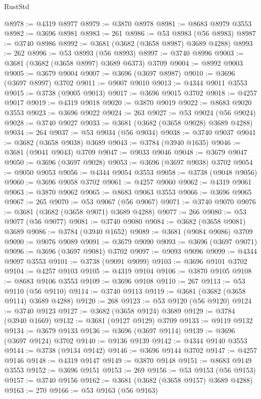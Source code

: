 \begin{lexlean}{RustStd}
\begin{coremodule}
@8978 := @4319 @8977
@8979 := @3870 @8978
@8981 := @8683 @8979 @3553
@8982 := @3696 @8981
@8983 := 261
@8986 := @53 @8983 (@56 @8983)
@8987 := @3740 @8986
@8992 := @3681 (@3682 (@3658 @8987) @3689 @4288)
@8993 := 262
@8996 := @53 @8993 (@56 @8993)
@8997 := @3740 @8996
@9003 := @3681 (@3682 (@3658 @8997) @3689 @6373) @3709
@9004 := @8992 @9003
@9005 := @3679 @9004
@9007 := @3696 (@3697 @8987)
@9010 := @3696 (@3697 @8997) @3702
@9011 := @9007 @9010
@9013 := @4344 @9011 @3553
@9015 := @3738 (@9005 @9013)
@9017 := @3696 @9015 @3702
@9018 := @4257 @9017
@9019 := @4319 @9018
@9020 := @3870 @9019
@9022 := @8683 @9020 @3553
@9023 := @3696 @9022
@9024 := 263
@9027 := @53 @9024 (@56 @9024)
@9028 := @3740 @9027
@9033 := @3681 (@3682 (@3658 @9028) @3689 @4288)
@9034 := 264
@9037 := @53 @9034 (@56 @9034)
@9038 := @3740 @9037
@9041 := @3682 (@3658 @9038) @3689
@9043 := @3784 (@3940 @1635)
@9046 := @3681 (@9041 @9043) @3709
@9047 := @9033 @9046
@9048 := @3679 @9047
@9050 := @3696 (@3697 @9028)
@9053 := @3696 (@3697 @9038) @3702
@9054 := @9050 @9053
@9056 := @4344 @9054 @3553
@9058 := @3738 (@9048 @9056)
@9060 := @3696 @9058 @3702
@9061 := @4257 @9060
@9062 := @4319 @9061
@9063 := @3870 @9062
@9065 := @8683 @9063 @3553
@9066 := @3696 @9065
@9067 := 265
@9070 := @53 @9067 (@56 @9067)
@9071 := @3740 @9070
@9076 := @3681 (@3682 (@3658 @9071) @3689 @4288)
@9077 := 266
@9080 := @53 @9077 (@56 @9077)
@9081 := @3740 @9080
@9084 := @3682 (@3658 @9081) @3689
@9086 := @3784 (@3940 @1652)
@9089 := @3681 (@9084 @9086) @3709
@9090 := @9076 @9089
@9091 := @3679 @9090
@9093 := @3696 (@3697 @9071)
@9096 := @3696 (@3697 @9081) @3702
@9097 := @9093 @9096
@9099 := @4344 @9097 @3553
@9101 := @3738 (@9091 @9099)
@9103 := @3696 @9101 @3702
@9104 := @4257 @9103
@9105 := @4319 @9104
@9106 := @3870 @9105
@9108 := @8683 @9106 @3553
@9109 := @3696 @9108
@9110 := 267
@9113 := @53 @9110 (@56 @9110)
@9114 := @3740 @9113
@9119 := @3681 (@3682 (@3658 @9114) @3689 @4288)
@9120 := 268
@9123 := @53 @9120 (@56 @9120)
@9124 := @3740 @9123
@9127 := @3682 (@3658 @9124) @3689
@9129 := @3784 (@3940 @1669)
@9132 := @3681 (@9127 @9129) @3709
@9133 := @9119 @9132
@9134 := @3679 @9133
@9136 := @3696 (@3697 @9114)
@9139 := @3696 (@3697 @9124) @3702
@9140 := @9136 @9139
@9142 := @4344 @9140 @3553
@9144 := @3738 (@9134 @9142)
@9146 := @3696 @9144 @3702
@9147 := @4257 @9146
@9148 := @4319 @9147
@9149 := @3870 @9148
@9151 := @8683 @9149 @3553
@9152 := @3696 @9151
@9153 := 269
@9156 := @53 @9153 (@56 @9153)
@9157 := @3740 @9156
@9162 := @3681 (@3682 (@3658 @9157) @3689 @4288)
@9163 := 270
@9166 := @53 @9163 (@56 @9163)

\end{coremodule}
\end{lexlean}
